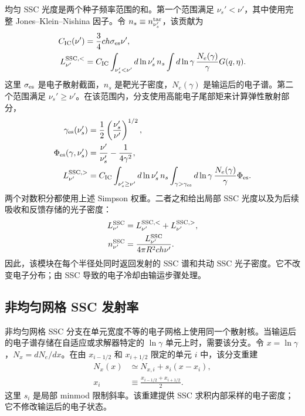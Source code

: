 \documentclass[twocolumn]{aastex702}
\begin{document}
均匀 SSC 光度是两个种子频率范围的和。第一个范围满足 \(\nu_s'<\nu'\)，其中使用完整 Jones--Klein--Nishina 因子。令 \(n_s\equiv n_{\nu_s'}^{\rm tar}\)，该贡献为
\begin{equation}
\begin{aligned}
C_{\rm IC}(\nu')&=\frac{3}{4}ch\sigma_{\rm es}\nu',\\
L_{\nu'}^{{\rm SSC},<}
&=C_{\rm IC}
\int_{\nu_s'<\nu'} d\ln\nu_s'\,n_s
\int d\ln\gamma\,\frac{N_e(\gamma)}{\gamma}
G(q,\eta).
\end{aligned}
\end{equation}
这里 \(\sigma_{\rm es}\) 是电子散射截面，\(n_s\) 是靶光子密度，\(N_e(\gamma)\) 是输运后的电子谱。第二个范围满足 \(\nu_s'\ge\nu'\)。在该范围内，分支使用高能电子尾部矩来计算弹性散射部分，
\begin{equation}
\begin{aligned}
\gamma_{\rm es}(\nu_s')
&=\frac{1}{2}\left(\frac{\nu_s'}{\nu'}\right)^{1/2},\\
\Phi_{\rm es}(\gamma,\nu_s')
&=\frac{\nu'}{\nu_s'}-\frac{1}{4\gamma^2},\\
L_{\nu'}^{{\rm SSC},>}
&=C_{\rm IC}
\int_{\nu_s'\ge\nu'}d\ln\nu_s'\,n_s
\int_{\gamma>\gamma_{\rm es}}d\ln\gamma\,
\frac{N_e(\gamma)}{\gamma}
\Phi_{\rm es}.
\end{aligned}
\end{equation}
两个对数积分都使用上述 Simpson 权重。二者之和给出局部 SSC 光度以及为后续吸收和反馈存储的光子密度：
\begin{equation}
\begin{aligned}
L_{\nu'}^{\rm SSC}
&=L_{\nu'}^{{\rm SSC},<}+L_{\nu'}^{{\rm SSC},>},\\
n_{\nu'}^{\rm SSC}
&=\frac{L_{\nu'}^{\rm SSC}}{4\pi R^2ch\nu'}.
\end{aligned}
\end{equation}
因此，该模块在每个半径处同时返回发射的 SSC 谱和共动 SSC 光子密度。它不改变电子分布；由 SSC 导致的电子冷却由输运步骤处理。

\subsection{非均匀网格 SSC 发射率}

非均匀网格 SSC 分支在单元宽度不等的电子网格上使用同一个散射核。当输运后的电子谱存储在自适应或求解器特定的 \(\ln\gamma\) 单元上时，需要该分支。令 \(x=\ln\gamma\)，\(N_x=dN_e/dx\)。在由 \(x_{i-1/2}\) 和 \(x_{i+1/2}\) 限定的单元 \(i\) 中，该分支重建
\begin{equation}
\begin{aligned}
N_x(x)&\simeq N_{x,i}+s_i(x-x_i),\\
x_i&\equiv \frac{x_{i-1/2}+x_{i+1/2}}{2}.
\end{aligned}
\end{equation}
这里 \(s_i\) 是局部 minmod 限制斜率。该重建提供 SSC 求积内部采样的电子密度；它不修改输运后的电子状态。
\end{document}
